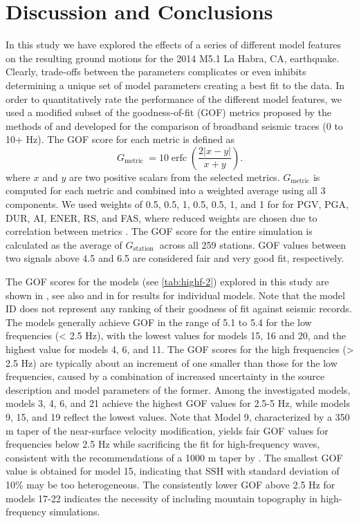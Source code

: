 \section{Discussion and Conclusions}
In this study we have explored the effects of a series of different model features on the resulting ground motions for the 2014 M5.1 La Habra, CA, earthquake. Clearly, trade-offs between the parameters complicates or even inhibits determining a unique set of model parameters creating a best fit to the data. 
In order to quantitatively rate the performance of the different model features, we used a modified subset of the goodness-of-fit (GOF) metrics proposed by the methods of \citet{andersonQuantitativeMeasureGoodnessOfFit2004} and \citet{olsenGoodnessoffitCriteriaBroadband2010} developed for the comparison of broadband seismic traces (0 to 10+ Hz).
The GOF score for each metric is defined as
\begin{equation}\label{qe:highf-4}
  G_{\text {metric }}=10 \operatorname{erfc}\left(\dfrac{2|x-y|}{x+y}\right).
\end{equation}
\noindent where $x$ and $y$ are two positive scalars from the selected metrics. $G_{\text {metric}}$ is computed for each metric and combined into a weighted average using all 3 components. We used weights of 0.5, 0.5, 1, 0.5, 0.5, 1, and 1 for for PGV, PGA, DUR, AI, ENER, RS, and FAS, where reduced weights are chosen due to correlation between metrics \citep{olsenGoodnessoffitCriteriaBroadband2010}. The GOF score for the entire simulation is calculated as the average of $G_{\text {station }}$ across all 259 stations. GOF values between two signals above 4.5 and 6.5 are considered fair and very good fit, respectively.

The GOF scores for the models (see \cref{tab:highf-2}) explored in this study are shown in , see also  and  in  for results for individual models. 
Note that the model ID does not represent any ranking of their goodness of fit against seismic records. The models generally achieve GOF in the range of 5.1 to 5.4 for the low frequencies (< 2.5 Hz), with the lowest values for models 15, 16 and 20, and the highest value for models 4, 6, and 11. The GOF scores for the high frequencies (> 2.5 Hz) are typically about an increment of one smaller than those for the low frequencies, caused by a combination of increased uncertainty in the source description and model parameters of the former. Among the investigated models, models 3, 4, 6, and 21 achieve the highest GOF values for 2.5-5 Hz, while models 9, 15, and 19 reflect the lowest values. Note that Model 9, characterized by a 350 m taper of the near-surface velocity modification, yields fair GOF values for frequencies below 2.5 Hz while sacrificing the fit for high-frequency waves, consistent with the recommendations of a 1000 m taper by \citet{huCalibrationNearsurfaceSeismic2021}. The smallest GOF value is obtained for model 15, indicating that SSH with standard deviation of 10\% may be too heterogeneous. The consistently lower GOF above 2.5 Hz for models 17-22 indicates the necessity of including mountain topography in high-frequency simulations.


